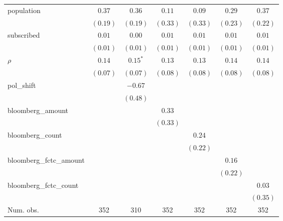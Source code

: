 \begin{table}[!h]
\begin{center}
\begin{tabular}{l c c c c c c }
population              & $0.37$       & $0.36$       & $0.11$       & $0.09$       & $0.29$       & $0.37$       \\
                        & $(0.19)$     & $(0.19)$     & $(0.33)$     & $(0.33)$     & $(0.23)$     & $(0.22)$     \\
subscribed              & $0.01$       & $0.00$       & $0.01$       & $0.01$       & $0.01$       & $0.01$       \\
                        & $(0.01)$     & $(0.01)$     & $(0.01)$     & $(0.01)$     & $(0.01)$     & $(0.01)$     \\
$\rho$                  & $0.14$       & $0.15^{*}$   & $0.13$       & $0.13$       & $0.14$       & $0.14$       \\
                        & $(0.07)$     & $(0.07)$     & $(0.08)$     & $(0.08)$     & $(0.08)$     & $(0.08)$     \\
pol\_shift              &              & $-0.67$      &              &              &              &              \\
                        &              & $(0.48)$     &              &              &              &              \\
bloomberg\_amount       &              &              & $0.33$       &              &              &              \\
                        &              &              & $(0.33)$     &              &              &              \\
bloomberg\_count        &              &              &              & $0.24$       &              &              \\
                        &              &              &              & $(0.22)$     &              &              \\
bloomberg\_fctc\_amount &              &              &              &              & $0.16$       &              \\
                        &              &              &              &              & $(0.22)$     &              \\
bloomberg\_fctc\_count  &              &              &              &              &              & $0.03$       \\
                        &              &              &              &              &              & $(0.35)$     \\
\midrule
Num. obs.               & 352          & 310          & 352          & 352          & 352          & 352          \\

\end{tabular}
\end{center}
\end{table}
